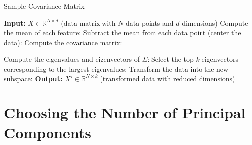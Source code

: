 \documentclass[serif, aspectratio=169]{beamer}
\begin{document}

\begin{frame}{Sample Covariance Matrix}
    \begin{algorithm}[H]
    \caption{Sample Covariance Matrix}\label{alg:Sample Covariance Matrix}
    \begin{algorithmic}[1]
         \State \textbf{Input:} $X \in \mathbb{R}^{N \times d}$ (data matrix with $N$ data points and $d$ dimensions)
        \State Compute the mean of each feature: 
        \State Subtract the mean from each data point (center the data): 
        \State Compute the covariance matrix: 

        \State Compute the eigenvalues and eigenvectors of $\Sigma$: 
        \State Select the top $k$ eigenvectors corresponding to the largest eigenvalues: 
        \State Transform the data into the new subspace:
        \State \textbf{Output:} $X' \in \mathbb{R}^{N \times k}$ (transformed data with reduced dimensions)
    \end{algorithmic}
    \end{algorithm}
\end{frame}

\section{Choosing the Number of Principal Components}
\end{document}
